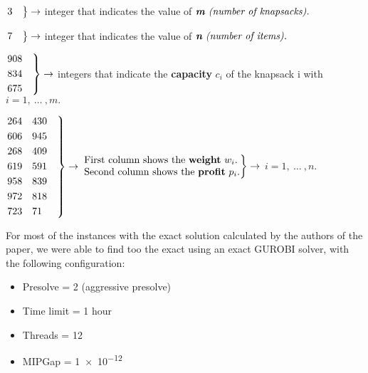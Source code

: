 	\begin{flushleft} 
		$\begin{rcases*}
			3 \quad
		\end{rcases*} \rightarrow $ integer that indicates the value of $ \textit{\textbf{m} (number of knapsacks).}$
	\end{flushleft}
	\begin{flushleft}
		$\begin{rcases*}
			7 \quad
		\end{rcases*} \rightarrow $ integer that indicates the value of $ \textit{\textbf{n} (number of items).}$
	\end{flushleft}

	\begin{flushleft}
		$\begin{rcases*}
			908 \quad
			\\834 
			\\675 
		\end{rcases*} \rightarrow $ integers that indicate the \textbf{capacity}  $ c_{i} $  of the knapsack i with \space $ i=1,\:\dots\:,m. $
	\end{flushleft}
	\begin{flushleft}
		$\begin{rcases*}
			264	\quad 430 \quad
			\\606 \quad	945
			\\268 \quad	409
			\\619 \quad	591
			\\958 \quad	839
			\\972 \quad	818
			\\723 \quad	71
		\end{rcases*} \rightarrow $ 
		$\begin{rcases*}
			{\begin{tabular}{@{}l@{}}
				First column shows the \textbf{weight} $ w_{i}. $ \\
				Second column shows the \textbf{profit} $ p_{i} $.
			\end{tabular}} 
		\end{rcases*} \rightarrow \space$ $ i=1,\:\dots\:,n. $
	\end{flushleft}

For most of the instances with the exact solution calculated by the authors of the paper, we were able to
find too the exact using an exact GUROBI solver, with the following configuration:

\begin{itemize}
    \item Presolve = 2 (aggressive presolve)
    \item Time limit = 1 hour
    \item Threads = 12
    \item MIPGap = \num{1e-12}
\end{itemize}

